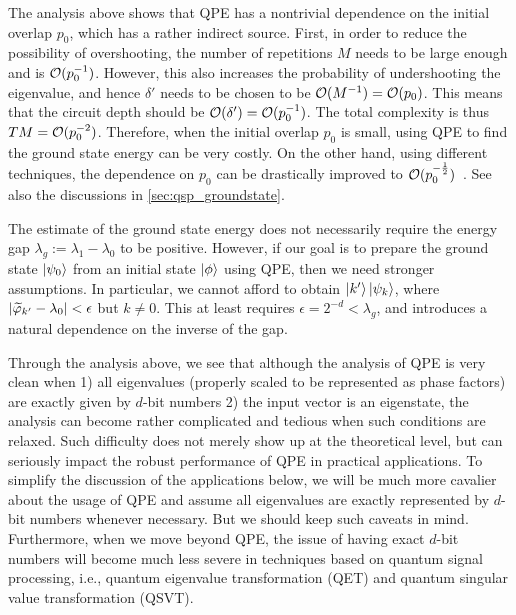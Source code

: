 \begin{rem}
The analysis above shows that QPE has a nontrivial dependence on the initial overlap $p_0$, which has a rather indirect source. 
First, in order to reduce the possibility of overshooting, the number of repetitions $M$ needs to be large enough and is $\mathcal{O}(p_0^{-1})$. 
However, this also increases the probability of undershooting the eigenvalue, and hence $\delta'$ needs to be chosen to be $\mathcal{O}(M^{-1})=\mathcal{O}(p_0)$. 
This means that the circuit depth should be $\mathcal{O}(\delta')=\mathcal{O}(p_0^{-1})$. The total complexity is thus $TM=\mathcal{O}(p_0^{-2})$. Therefore, when the initial overlap $p_0$ is small, using QPE to find the ground state energy can be very costly. 
On the other hand, using different techniques, the dependence on $p_0$ can be drastically improved to $\mathcal{O}(p_0^{-\frac12})$~\cite{LinTong2020}. See also the discussions in \cref{sec:qsp_groundstate}.

\end{rem}

\begin{rem}
The estimate of the ground state energy does not necessarily require the energy gap $\lambda_g:=\lambda_1-\lambda_0$ to be positive. 
However, if our goal is to prepare the ground state $\ket{\psi_0}$ from an initial state $\ket{\phi}$ using QPE, then we need stronger assumptions.
In particular, we cannot afford to obtain $\ket{k'}\ket{\psi_k}$, where $\left\lvert\widetilde{\varphi}_{k'}-\lambda_0\right\rvert<\epsilon$ but $k\ne 0$. This at least requires $\epsilon=2^{-d}<\lambda_g$, and introduces a natural dependence on the inverse of the gap.
\end{rem} 

Through the analysis above, we see that although the analysis of QPE is very clean when 1) all eigenvalues (properly scaled to be represented as phase factors) are exactly given by $d$-bit numbers 2) the input vector is an eigenstate, the analysis can become rather complicated and tedious when such conditions are relaxed. 
Such difficulty does not merely show up at the theoretical level, but can seriously impact the robust performance of QPE in practical applications. 
To simplify the discussion of the applications below, we will be much more cavalier about the usage of QPE and assume all eigenvalues are exactly represented by $d$-bit numbers whenever necessary.
But we should keep such caveats in mind. 
Furthermore, when we move beyond QPE, the issue of having exact $d$-bit numbers will become much less severe in techniques based on quantum signal processing, i.e., quantum eigenvalue transformation (QET) and quantum singular value transformation (QSVT). 

